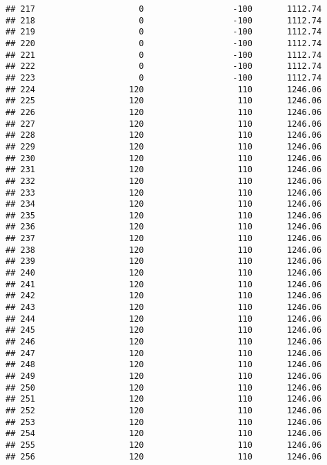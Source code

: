 \documentclass[]{article}
\begin{document}
\begin{verbatim}
## 217                     0                  -100       1112.74
## 218                     0                  -100       1112.74
## 219                     0                  -100       1112.74
## 220                     0                  -100       1112.74
## 221                     0                  -100       1112.74
## 222                     0                  -100       1112.74
## 223                     0                  -100       1112.74
## 224                   120                   110       1246.06
## 225                   120                   110       1246.06
## 226                   120                   110       1246.06
## 227                   120                   110       1246.06
## 228                   120                   110       1246.06
## 229                   120                   110       1246.06
## 230                   120                   110       1246.06
## 231                   120                   110       1246.06
## 232                   120                   110       1246.06
## 233                   120                   110       1246.06
## 234                   120                   110       1246.06
## 235                   120                   110       1246.06
## 236                   120                   110       1246.06
## 237                   120                   110       1246.06
## 238                   120                   110       1246.06
## 239                   120                   110       1246.06
## 240                   120                   110       1246.06
## 241                   120                   110       1246.06
## 242                   120                   110       1246.06
## 243                   120                   110       1246.06
## 244                   120                   110       1246.06
## 245                   120                   110       1246.06
## 246                   120                   110       1246.06
## 247                   120                   110       1246.06
## 248                   120                   110       1246.06
## 249                   120                   110       1246.06
## 250                   120                   110       1246.06
## 251                   120                   110       1246.06
## 252                   120                   110       1246.06
## 253                   120                   110       1246.06
## 254                   120                   110       1246.06
## 255                   120                   110       1246.06
## 256                   120                   110       1246.06

\end{verbatim}
\end{document}
